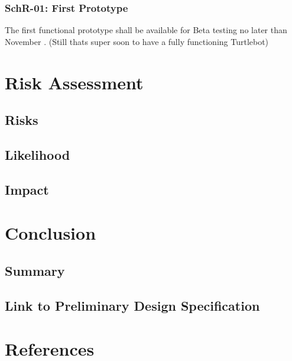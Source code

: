 \documentclass[]{report}
\begin{document}
\subsection{SchR-01: First Prototype}

The first functional prototype shall be available for Beta testing no later than November . (Still thats super soon to have a fully functioning Turtlebot)

\chapter{Risk Assessment}

\section{Risks}

\section{Likelihood}

\section{Impact}

\chapter{Conclusion}

\section{Summary}

\section{Link to Preliminary Design Specification}

\chapter*{References}
\end{document}
